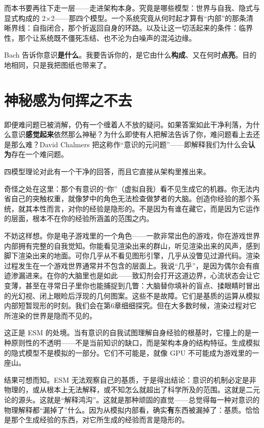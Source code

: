\documentclass[11pt, twoside, openright]{book}
\begin{document}
而本书要再往下走一层------走进架构本身。究竟是哪些模型：世界与自我、隐式与显式构成的 2×2------那四个模型。一个系统究竟从何时起才算有“内部”的那条清晰界线：自指闭合，那个折返回自身的环路。以及让这一切活起来的条件：临界性，那个让系统既不僵死冻结、也不沦为白噪声的混沌边缘。

Bach 告诉你意识\textbf{是什么}。我要告诉你的，是它由什么\textbf{构成}、又在何时\textbf{点亮}。目的地相同，只是我把图纸也带来了。

\section*{神秘感为何挥之不去}

即便难问题已被消解，仍有一个缠着人不放的疑问。如果答案如此干净利落，为什么意识\textbf{感觉起来}依然那么神秘？为什么即使有人把解法告诉了你，难问题看上去还是那么难？David Chalmers 把这称作“意识的元问题”------即解释我们为什么会\textbf{认为}存在一个难问题。

四模型理论对此有一个干净的回答，而且它直接从架构里推出来。

奇怪之处在这里：那个有意识的“你”（虚拟自我）看不见生成它的机器。你无法内省自己的突触权重，就像梦中的角色无法检查做梦者的大脑。创造你经验的那个系统，就其本性而言，对你的经验是隐形的。不是因为有谁在藏它，而是因为它运作的层面，根本不在你的经验所涵盖的范围之内。

不妨这样想。你是电子游戏里的一个角色------一款非常出色的游戏，你在游戏世界内部拥有完整的自我觉知。你能看见渲染出来的群山，听见渲染出来的风声，感到脚下渲染出来的地面。可你几乎从不看见图形引擎，几乎从没瞥见过源代码。渲染过程发生在一个游戏世界通常并不包含的层面上。我说“几乎”，是因为偶尔会有痕迹渗漏进来。在你的大脑里也是如此------致幻剂会打开这道边界，心流状态会让它变薄，甚至在寻常日子里你也能捕捉到几瞥：大脑替你填补的盲点、揉眼睛时冒出的光幻视、闭上眼睑后浮现的几何图案。这些不是故障。它们是基质的运算从模拟内部短暂现形的时刻。我们会在第6章细细探究。但在大多数时候，渲染过程对它所渲染的世界是隐而不见的。

这正是 ESM 的处境。当有意识的自我试图理解自身经验的根基时，它撞上的是一种原则性的不透明------不是当前知识的缺口，而是架构本身的结构特征。生成模拟的隐式模型不是模拟的一部分。它们不可能是，就像 GPU 不可能成为游戏里的一座山。

结果可想而知。ESM 无法观察自己的基质，于是得出结论：意识的机制必定是非物理的，或从根本上无法解释，或不知怎么就超出了科学所及的范围。这就是二元论的源头。这就是“解释鸿沟”。这就是那种顽固的直觉------总觉得每一种对意识的物理解释都“漏掉了”什么。因为从模拟内部看，确实\textbf{有}东西被漏掉了：基质。恰恰是那个生成经验的东西，对它所生成的经验而言是隐形的。
\end{document}
